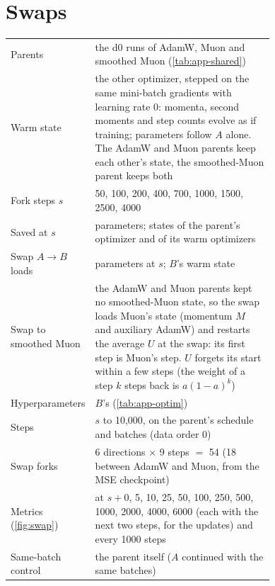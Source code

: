 \section{Swaps}
\label{app:forks}

\begin{center}\small\begin{minipage}{\linewidth}\centering
\captionsetup{type=table}
\caption{Swaps. $A$: parent's optimizer; $B$: optimizer after the swap; $s$: fork step.}
\label{tab:app-forks}
\begin{tabular}{@{}lp{0.74\linewidth}@{}}
\hline
Parents & the d0 runs of AdamW, Muon and smoothed Muon (\cref{tab:app-shared}) \\
Warm state & the other optimizer, stepped on the same mini-batch gradients with learning rate 0: momenta, second
  moments and step counts evolve as if training; parameters follow $A$ alone. The AdamW and Muon parents keep each
  other's state, the smoothed-Muon parent keeps both \\
Fork steps $s$ & 50, 100, 200, 400, 700, 1000, 1500, 2500, 4000 \\
Saved at $s$ & parameters; states of the parent's optimizer and of its warm optimizers \\
\hline
Swap $A\to B$ loads & parameters at $s$; $B$'s warm state \\
Swap to smoothed Muon & the AdamW and Muon parents kept no smoothed-Muon state, so the swap loads Muon's state (momentum
  $M$ and auxiliary AdamW) and restarts the average $U$ at the swap: its first step is Muon's step. $U$ forgets its
  start within a few steps (the weight of a step $k$ steps back is $a(1-a)^k$) \\
Hyperparameters & $B$'s (\cref{tab:app-optim}) \\
Steps & $s$ to 10{,}000, on the parent's schedule and batches (data order 0) \\
Swap forks & 6 directions $\times$ 9 steps $=$ 54 (18 between AdamW and Muon, from the MSE checkpoint) \\
Metrics (\cref{fig:swap}) & at $s+{}$0, 5, 10, 25, 50, 100, 250, 500, 1000, 2000, 4000, 6000 (each with the next
  two steps, for the updates) and every 1000 steps \\
\hline
Same-batch control & the parent itself ($A$ continued with the same batches) \\
\hline
\end{tabular}\end{minipage}
\end{center}

